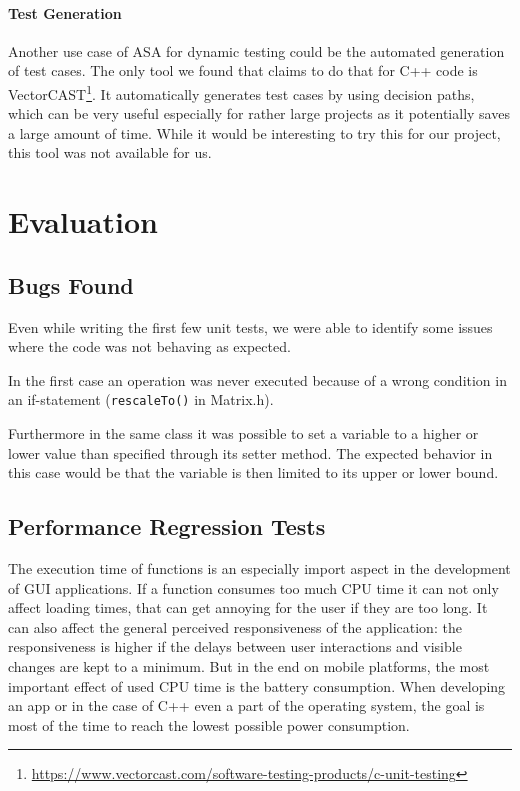 \documentclass{scrreprt}
\begin{document}
\paragraph{Test Generation} Another use case of ASA for dynamic testing could be the automated generation of test cases. The only tool we found that claims to do that for C++ code is VectorCAST\footnote{\url{https://www.vectorcast.com/software-testing-products/c-unit-testing}}. It automatically generates test cases by using decision paths, which can be very useful especially for rather large projects as it potentially saves a large amount of time. While it would be interesting to try this for our project, this tool was not available for us.

\section{Evaluation}

\subsection{Bugs Found}
Even while writing the first few unit tests, we were able to identify some issues where the code was not behaving as expected.

In the first case an operation was never executed because of a wrong condition in an if-statement (\texttt{rescaleTo()} in Matrix.h).

Furthermore in the same class it was possible to set a variable to a higher or lower value than specified through its setter method. The expected behavior in this case would be that the variable is then limited to its upper or lower bound.

\subsection{Performance Regression Tests}
\label{performance_regression_tests}

The execution time of functions is an especially import aspect in the development of GUI applications. If a function consumes too much CPU time it can not only affect loading times, that can get annoying for the user if they are too long. It can also affect the general perceived responsiveness of the application: the responsiveness is higher if the delays between user interactions and visible changes are kept to a minimum. But in the end on mobile platforms, the most important effect of used CPU time is the battery consumption. When developing an app or in the case of C++ even a part of the operating system, the goal is most of the time to reach the lowest possible power consumption.
\end{document}
